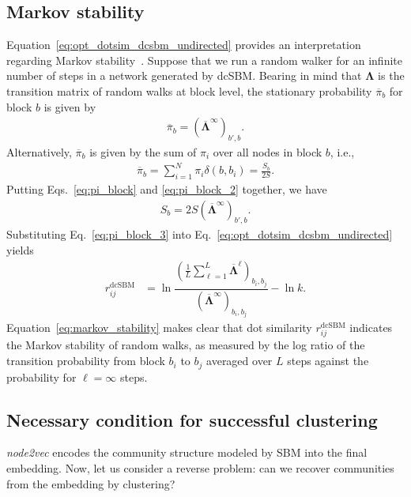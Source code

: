 \documentclass[12pt]{article} %
\def\ie{i.e.,~}
\def\mat#1{\mathbf{#1}}
\begin{document}
\subsection{Markov stability}

Equation~\eqref{eq:opt_dotsim_dcsbm_undirected} provides an interpretation regarding Markov stability~\cite{Delvenne2010}.
Suppose that we run a random walker for an infinite number of steps in a network generated by dcSBM.
Bearing in mind that $\mat{\Lambda}$ is the transition matrix of random walks at block level, the stationary probability $\overline \pi_b$ for block $b$ is given by
\begin{align}
    \label{eq:pi_block}
    \overline \pi_b = (\mat{\overline \Lambda}^\infty )_{b',b}.
\end{align}
Alternatively, $\overline \pi_b$ is given by the sum of $\pi_i$ over all nodes in block $b$, \ie
\begin{align}
    \label{eq:pi_block_2}
    \overline \pi_b = \sum_{i=1}^N \pi_i \delta(b, b_i) = \frac{S_b}{2S}.
\end{align}
Putting Eqs.~\eqref{eq:pi_block} and \eqref{eq:pi_block_2} together, we have
\begin{align}
    \label{eq:pi_block_3}
    S_b = 2S (\mat{\overline \Lambda}^\infty )_{b',b}.
\end{align}
Substituting Eq.~\eqref{eq:pi_block_3} into Eq.~\eqref{eq:opt_dotsim_dcsbm_undirected} yields
\begin{align}
    \label{eq:markov_stability}
    r^{\text{dcSBM}} _{ij}
    & = \ln \dfrac{\left(\frac{1}{L}\sum_{\ell=1}^L \mat{\overline \Lambda}^\ell \right)_{b_i, b_j}}{\left(\mat{\overline \Lambda}^\infty\right)_{b_i, b_j}} - \ln k.
\end{align}
Equation~\eqref{eq:markov_stability} makes clear that
dot similarity $r^{\text{dcSBM}} _{ij}$ indicates the Markov stability of random walks, as measured by the log ratio of the transition probability from block $b_i$ to $b_j$ averaged over $L$ steps against the probability for $\ell=\infty$ steps.

\subsection{Necessary condition for successful clustering}
\label{sec:community_dcsbm}

\textit{node2vec} encodes the community structure modeled by SBM into the final embedding.
Now, let us consider a reverse problem: can we recover communities from the embedding by clustering?
\end{document}
